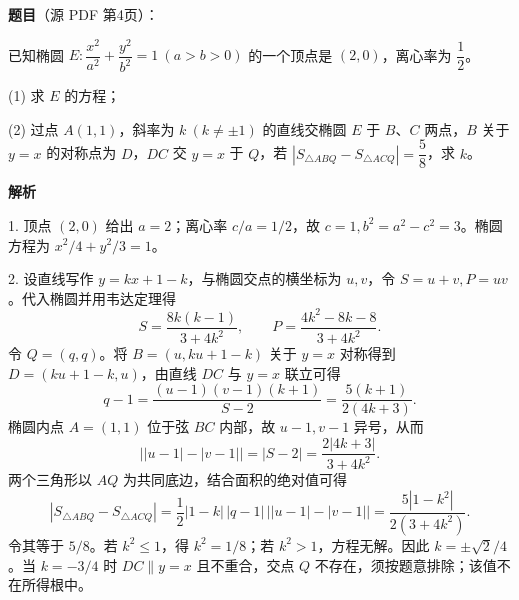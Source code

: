 \begin{answer}

\textbf{题目}（源 PDF 第4页）：

已知椭圆 \(E:\dfrac{x^2}{a^2}+\dfrac{y^2}{b^2}=1\ (a>b>0)\) 的一个顶点是 \((2,0)\)，离心率为 \(\dfrac{1}{2}\)。

(1) 求 \(E\) 的方程；

(2) 过点 \(A(1,1)\)，斜率为 \(k\ (k\ne\pm1)\) 的直线交椭圆 \(E\) 于 \(B、C\) 两点，\(B\) 关于 \(y=x\) 的对称点为 \(D\)，\(DC\) 交 \(y=x\) 于 \(Q\)，若 \(\left\lvert S_{\triangle ABQ}-S_{\triangle ACQ}\right\rvert=\dfrac{5}{8}\)，求 \(k\)。

\textbf{解析}


1. 顶点 \((2,0)\) 给出 \(a=2\)；离心率 \(c/a=1/2\)，故 \(c=1,b^2=a^2-c^2=3\)。椭圆方程为 \(x^2/4+y^2/3=1\)。

2. 设直线写作 \(y=kx+1-k\)，与椭圆交点的横坐标为 \(u,v\)，令 \(S=u+v,P=uv\)。代入椭圆并用韦达定理得
\nopagebreak[4]
\[
   S=\frac{8k(k-1)}{3+4k^2},\qquad P=\frac{4k^2-8k-8}{3+4k^2}.
\]
   令 \(Q=(q,q)\)。将 \(B=(u,ku+1-k)\) 关于 \(y=x\) 对称得到 \(D=(ku+1-k,u)\)，由直线 \(DC\) 与 \(y=x\) 联立可得
\nopagebreak[4]
\[
   q-1=\frac{(u-1)(v-1)(k+1)}{S-2}=\frac{5(k+1)}{2(4k+3)}.
\]
   椭圆内点 \(A=(1,1)\) 位于弦 \(BC\) 内部，故 \(u-1,v-1\) 异号，从而
\nopagebreak[4]
\[
   \bigl||u-1|-|v-1|\bigr|=|S-2|=\frac{2|4k+3|}{3+4k^2}.
\]
   两个三角形以 \(AQ\) 为共同底边，结合面积的绝对值可得
\nopagebreak[4]
\[
   \left|S_{\triangle ABQ}-S_{\triangle ACQ}\right|
   =\frac12|1-k|\,|q-1|\,\bigl||u-1|-|v-1|\bigr|
   =\frac{5|1-k^2|}{2(3+4k^2)}.
\]
   令其等于 \(5/8\)。若 \(k^2\le1\)，得 \(k^2=1/8\)；若 \(k^2>1\)，方程无解。因此 \(k=\pm\sqrt2/4\)。当 \(k=-3/4\) 时 \(DC\parallel y=x\) 且不重合，交点 \(Q\) 不存在，须按题意排除；该值不在所得根中。



\end{answer}
